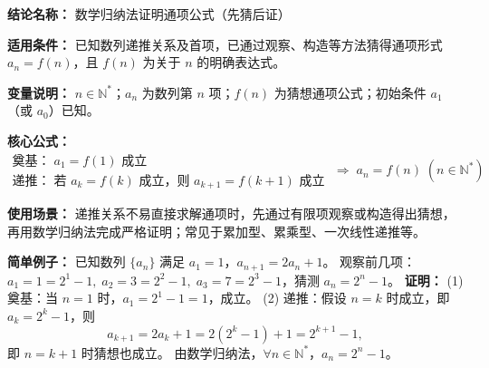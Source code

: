 \textbf{结论名称：} 数学归纳法证明通项公式（先猜后证）

\textbf{适用条件：} 已知数列递推关系及首项，已通过观察、构造等方法猜得通项形式 \(a_n=f(n)\)，且 \(f(n)\) 为关于 \(n\) 的明确表达式。

\textbf{变量说明：} \(n\in\mathbb{N}^*\)；\(a_n\) 为数列第 \(n\) 项；\(f(n)\) 为猜想通项公式；初始条件 \(a_1\)（或 \(a_0\)）已知。

\textbf{核心公式：}
\[
\boxed{
\begin{array}{l}
\text{奠基：} \; a_1 = f(1) \text{ 成立}\\[2pt]
\text{递推：} \; \text{若 } a_k = f(k) \text{ 成立，则 } a_{k+1} = f(k+1) \text{ 成立}
\end{array}
\;\Longrightarrow\; a_n = f(n)\;(n\in\mathbb{N}^*)
}
\]

\textbf{使用场景：} 递推关系不易直接求解通项时，先通过有限项观察或构造得出猜想，再用数学归纳法完成严格证明；常见于累加型、累乘型、一次线性递推等。

\textbf{简单例子：}
已知数列 \(\{a_n\}\) 满足 \(a_1=1\)，\(a_{n+1}=2a_n+1\)。\newline
观察前几项：\(a_1=1=2^1-1,\; a_2=3=2^2-1,\; a_3=7=2^3-1\)，猜测 \(a_n=2^n-1\)。
\textbf{证明：}
(1) 奠基：当 \(n=1\) 时，\(a_1=2^1-1=1\)，成立。\newline
(2) 递推：假设 \(n=k\) 时成立，即 \(a_k=2^k-1\)，则
\[
a_{k+1}=2a_k+1=2(2^k-1)+1=2^{k+1}-1,
\]
即 \(n=k+1\) 时猜想也成立。\newline
由数学归纳法，\(\forall n\in\mathbb{N}^*\)，\(a_n=2^n-1\)。